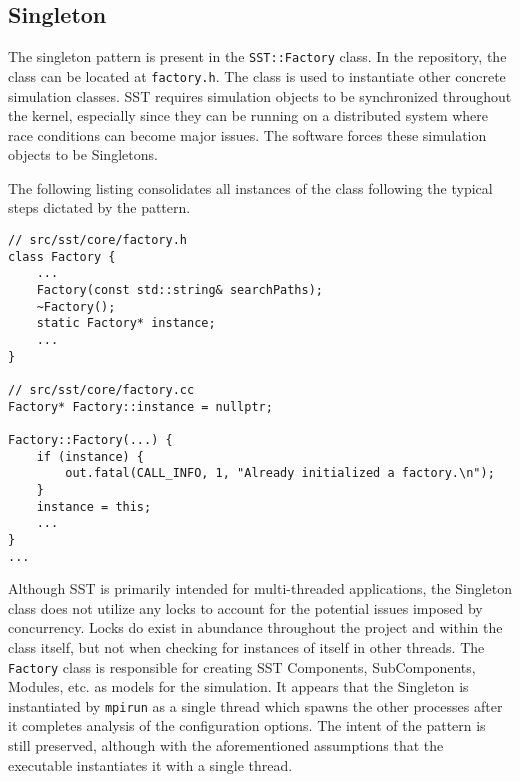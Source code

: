
\subsection{Singleton}
The singleton pattern is present in the \texttt{SST::Factory} class. In the repository, the class can be located at \texttt{factory.h}. The class is used to instantiate other concrete simulation classes. SST requires simulation objects to be synchronized throughout the kernel, especially since they can be running on a distributed system where race conditions can become major issues. The software forces these simulation objects to be Singletons.

The following listing consolidates all instances of the class following the typical steps dictated by the pattern.

\begin{lstlisting}[style=customC++,label=singleton,caption=Factory Implementing the Singleton Pattern]
// src/sst/core/factory.h
class Factory {
    ...
    Factory(const std::string& searchPaths);
    ~Factory();
    static Factory* instance;
    ...
}

// src/sst/core/factory.cc
Factory* Factory::instance = nullptr;

Factory::Factory(...) {
    if (instance) {
        out.fatal(CALL_INFO, 1, "Already initialized a factory.\n");
    }
    instance = this;
    ...
}
...
\end{lstlisting}

Although SST is primarily intended for multi-threaded applications, the Singleton class does not utilize any locks to account for the potential issues imposed by concurrency. Locks do exist in abundance throughout the project and within the class itself, but not when checking for instances of itself in other threads. The \texttt{Factory} class is responsible for creating SST Components, SubComponents, Modules, etc. as models for the simulation. It appears that the Singleton is instantiated by \texttt{mpirun} as a single thread which spawns the other processes after it completes analysis of the configuration options. The intent of the pattern is still preserved, although with the aforementioned assumptions that the executable instantiates it with a single thread.

